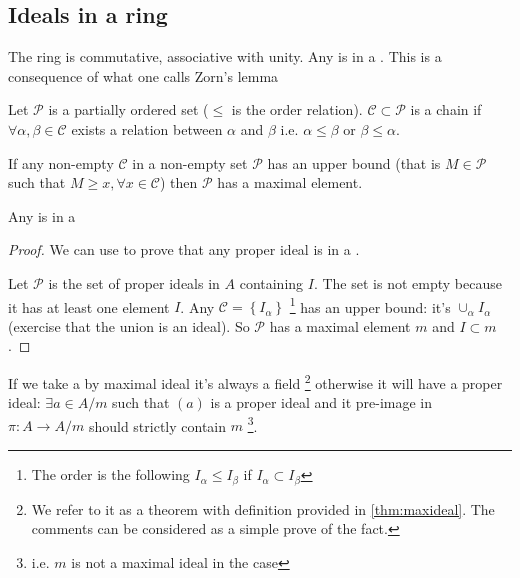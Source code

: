 \subsection{Ideals in a ring}
\label{sec:lec2_ideals}
The ring is commutative, associative with unity. Any
 is in a . This is a
consequence of what one calls Zorn's lemma

\begin{definition}[Chain]
  Let $\mathcal{P}$ is a partially ordered set ($\le$ is the order
  relation). $\mathcal{C} \subset \mathcal{P}$ is a chain if
  $\forall \alpha, \beta \in \mathcal{C}$ exists a relation between
  $\alpha$ and $\beta$ i.e. $\alpha \le \beta$ or $\beta \le \alpha$.
  \label{def:chain}
\end{definition}

\begin{lemma}[Zorn]
  If any non-empty  $\mathcal{C}$ in a non-empty set
  $\mathcal{P}$ has an upper bound (that is $M \in \mathcal{P}$ such
  that $M \ge x, \forall x \in \mathcal{C}$) then $\mathcal{P}$ has a
  maximal element.
  \label{lem:zorn}
\end{lemma}

\begin{proposition}
  Any  is in a 
  \begin{proof}
    We can use  to prove that any proper ideal is
    in a .
    
    Let $\mathcal{P}$ is the set of proper ideals in $A$ containing
    $I$. The set is not empty because it has at least one element $I$. Any
     $\mathcal{C} = \left\{I_\alpha\right\}$
    \footnote{
      The order is the following $I_\alpha \le I_\beta$ if
      $I_\alpha \subset I_\beta$
    }
    has an upper bound: it's $\cup_\alpha I_\alpha$ (exercise that the
    union is an ideal). So $\mathcal{P}$ has a maximal element $m$ and $I
    \subset m$.    
  \end{proof}
  \label{prop:propermaxideal}
\end{proposition}

If we take a  by maximal ideal it's always a
field
\footnote{
  We refer to it as a theorem with definition provided in
  \ref{thm:maxideal}. The comments can be considered as a simple prove
  of the fact. 
}
otherwise 
it will have a proper ideal: $\exists a \in A/m$ such that $(a)$ is a
proper ideal and it pre-image in $\pi: A \to A/m$ should strictly
contain $m$
\footnote{ i.e. $m$ is not a maximal ideal in the case}.


